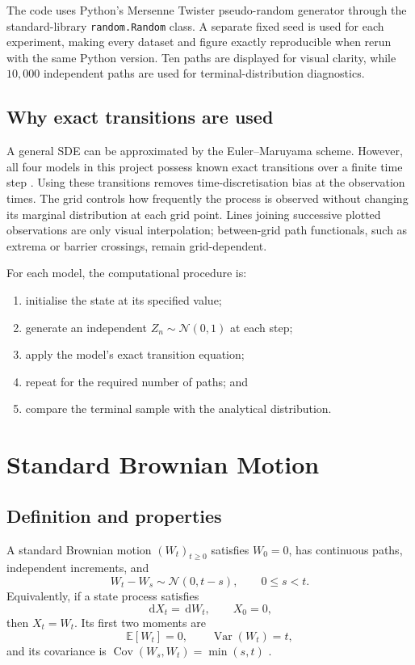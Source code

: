 \documentclass[11pt,a4paper]{article}
\newcommand{\E}{\mathbb{E}}
\newcommand{\Var}{\operatorname{Var}}
\newcommand{\dd}{\,\mathrm{d}}
\newcommand{\Normal}{\mathcal{N}}
\begin{document}
The code uses Python's Mersenne Twister pseudo-random generator through the standard-library \texttt{random.Random} class. A separate fixed seed is used for each experiment, making every dataset and figure exactly reproducible when rerun with the same Python version. Ten paths are displayed for visual clarity, while $10{,}000$ independent paths are used for terminal-distribution diagnostics.

\subsection{Why exact transitions are used}

A general SDE can be approximated by the Euler--Maruyama scheme. However, all four models in this project possess known exact transitions over a finite time step \cite{glasserman}. Using these transitions removes time-discretisation bias at the observation times. The grid controls how frequently the process is observed without changing its marginal distribution at each grid point. Lines joining successive plotted observations are only visual interpolation; between-grid path functionals, such as extrema or barrier crossings, remain grid-dependent.

For each model, the computational procedure is:
\begin{enumerate}
  \item initialise the state at its specified value;
  \item generate an independent $Z_n\sim\Normal(0,1)$ at each step;
  \item apply the model's exact transition equation;
  \item repeat for the required number of paths; and
  \item compare the terminal sample with the analytical distribution.
\end{enumerate}

\section{Standard Brownian Motion}

\subsection{Definition and properties}

A standard Brownian motion $(W_t)_{t\geq0}$ satisfies $W_0=0$, has continuous paths, independent increments, and
\[
  W_t-W_s\sim\Normal(0,t-s), \qquad 0\leq s<t.
\]
Equivalently, if a state process satisfies
\[
  \dd X_t=\dd W_t, \qquad X_0=0,
\]
then $X_t=W_t$. Its first two moments are
\[
  \E[W_t]=0, \qquad \Var(W_t)=t,
\]
and its covariance is $\operatorname{Cov}(W_s,W_t)=\min(s,t)$ \cite{shreve}.
\end{document}
